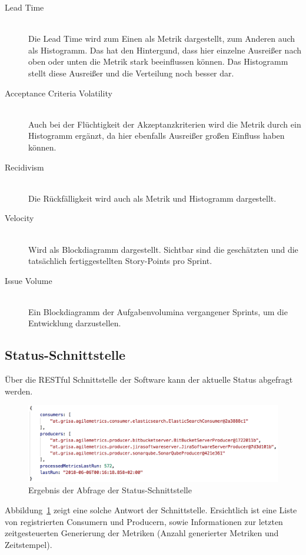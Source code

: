 \begin{description}
    \item[Lead Time] \hfill \\ Die Lead Time wird zum Einen als Metrik dargestellt, zum Anderen auch als Histogramm. Das hat den Hintergund, dass hier einzelne Ausreißer nach oben oder unten die Metrik stark beeinflussen können. Das Histogramm stellt diese Ausreißer und die Verteilung noch besser dar.
    \item[Acceptance Criteria Volatility] \hfill \\ Auch bei der Flüchtigkeit der Akzeptanzkriterien wird die Metrik durch ein Histogramm ergänzt, da hier ebenfalls Ausreißer großen Einfluss haben können.
    \item[Recidivism] \hfill \\ Die Rückfälligkeit wird auch als Metrik und Histogramm dargestellt.
    \item[Velocity] \hfill \\ Wird als Blockdiagramm dargestellt. Sichtbar sind die geschätzten und die tatsächlich fertiggestellten Story-Points pro Sprint.
    \item[Issue Volume] \hfill \\ Ein Blockdiagramm der Aufgabenvolumina vergangener Sprints, um die Entwicklung darzustellen.
\end{description}

\subsection{Status-Schnittstelle}

Über die RESTful Schnittstelle der Software kann der aktuelle Status abgefragt werden.

\begin{savenotes}
    \begin{figure}[H] 
        \centering
            \includegraphics[width=1.0\textwidth]{img/status-api.png}
        \caption{Ergebnis der Abfrage der Status-Schnittstelle}\label{fig:status-api}
    \end{figure}
\end{savenotes}

Abbildung~\ref{fig:status-api} zeigt eine solche Antwort der Schnittstelle. 
Ersichtlich ist eine Liste von registrierten Consumern und Producern, sowie Informationen zur letzten zeitgesteuerten Generierung der Metriken (Anzahl generierter Metriken und Zeitstempel).
